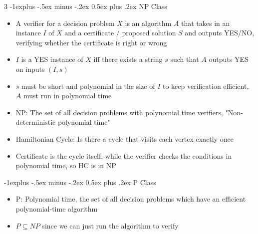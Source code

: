 \documentclass[10pt, landscape]{article}
\makeatletter
\renewcommand{\section}{\@startsection{section}{1}{0mm}%
                                {-1ex plus -.5ex minus -.2ex}%
                                {0.5ex plus .2ex}%
                                {\normalfont\large\bfseries}}
\renewcommand{\section}{\@startsection{section}{2}{0mm}%
                                {-1explus -.5ex minus -.2ex}%
                                {0.5ex plus .2ex}%
                                {\normalfont\normalsize\bfseries}}
\makeatother
\begin{document}
\begin{multicols*}{3}
\section{NP Class}
\begin{itemize}
    \item A verifier for a decision problem $X$ is an algorithm $A$ that takes in an instance $I$ of $X$ and a certificate / proposed solution $S$ and outputs YES/NO, verifying whether the certificate is right or wrong
    \item $I$ is a YES instance of $X$ iff there exists a string $s$ such that $A$ outputs YES on inputs $(I,s)$
    \item $s$ must be short and polynomial in the size of $I$ to keep verification efficient, $A$ must run in polynomial time
    \item NP: The set of all decision problems with polynomial time verifiers, "Non-deterministic polynomial time"
    \item Hamiltonian Cycle: Is there a cycle that visits each vertex exactly once
    \item Certificate is the cycle itself, while the verifier checks the conditions in polynomial time, so HC is in NP
\end{itemize}

\section{P Class}
\begin{itemize}
    \item P: Polynomial time, the set of all decision problems which have an efficient polynomial-time algorithm
    \item $P \subseteq NP$ since we can just run the algorithm to verify
\end{itemize}


\end{multicols*}
\end{document}
